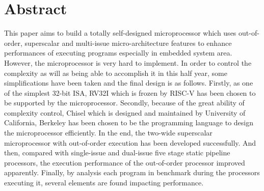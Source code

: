 \chapter*{Abstract}%

This paper aims to build a totally self-designed microprocessor which uses out-of-order, superscalar and multi-issue micro-architecture features to enhance performances of executing programs especially in embedded system area. However, the microprocessor is very hard to implement. In order to control the complexity as will as being able to accomplish it in this half year, some simplifications have been taken and the final design is as follows. Firstly, as one of the simplest 32-bit ISA, RV32I which is frozen by RISC-V has been chosen to be supported by the microprocessor. Secondly, because of the great ability of complexity control, Chisel which is designed and maintained by University of California, Berkeley has been chosen to be the programming language to design the microprocessor efficiently. In the end, the two-wide superscalar microprocessor with out-of-order execution has been developed successfully. And then, compared with single-issue and dual-issue five stage static pipeline processors, the execution performance of the out-of-order processor improved apparently. Finally, by analysis each program in benchmark during the processors executing it, several elements are found impacting performance.

